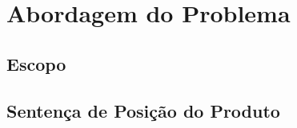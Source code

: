 \chapter [Abordagem do problema]{Abordagem do Problema}

\section {\large{Escopo}}
\section {\large{Sentença de Posição do Produto}}